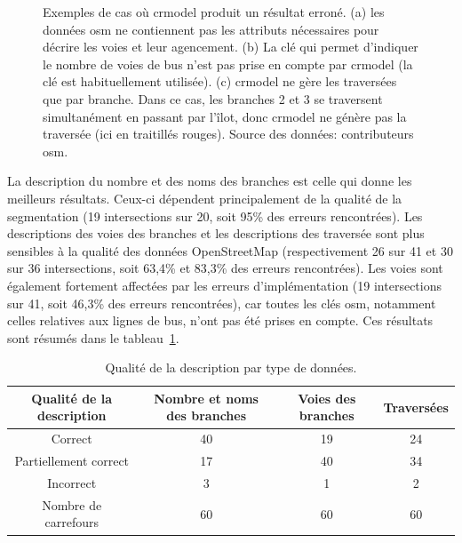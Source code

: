 \begin{figure}[ht]
\begin{subfigure}[t]{.3\linewidth}
        \caption{}
    \end{subfigure}
    \caption[Exemples de résultats erronés de crmodel]{Exemples de cas où crmodel produit un résultat erroné. (a) les données \gls{osm} ne contiennent pas les attributs nécessaires pour décrire les voies et leur agencement. (b) La clé  qui permet d'indiquer le nombre de voies de bus n'est pas prise en compte par crmodel (la clé  est habituellement utilisée). (c) crmodel ne gère les traversées que par branche. Dans ce cas, les branches 2 et 3 se traversent simultanément en passant par l'îlot, donc crmodel ne génère pas la traversée (ici en traitillés rouges). Source des données: contributeurs \gls{osm}.}
    \label{fig:eval_ex_err_crmodel}
\end{figure}

\newpar{}

La description du nombre et des noms des branches est celle qui donne les meilleurs résultats. Ceux-ci dépendent principalement de la qualité de la segmentation (19 intersections sur 20, soit 95\% des erreurs rencontrées). Les descriptions des voies des branches et les descriptions des traversée sont plus sensibles à la qualité des données OpenStreetMap (respectivement 26 sur 41 et 30 sur 36 intersections, soit 63,4\% et 83,3\% des erreurs rencontrées). Les voies sont également fortement affectées par les erreurs d'implémentation (19 intersections sur 41, soit 46,3\% des erreurs rencontrées), car toutes les clés \gls{osm}, notamment celles relatives aux lignes de bus, n'ont pas été prises en compte.  Ces résultats sont résumés dans le tableau~\ref{tab:descqualitybydesctype}.

\begin{table}[ht]
    \begin{center}
        \footnotesize
        \begin{tabular}{ c | c | c | c }
            Qualité de la description & Nombre et noms des branches & Voies des branches & Traversées\\
            \hline
            Correct & 40  & 19 & 24 \\
            Partiellement correct & 17 & 40 & 34 \\
            Incorrect & 3 & 1 & 2 \\
            \hline
            Nombre de carrefours & 60 & 60 & 60
        \end{tabular}
        \caption[Qualité de la description par type de données]{Qualité de la description par type de données.}
        \label{tab:descqualitybydesctype}
    \end{center}
\end{table}

